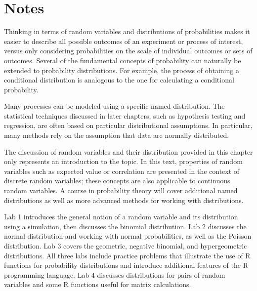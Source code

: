 

\section{Notes}
\label{sectionDistOfRVNotes}

Thinking in terms of random variables and distributions of probabilities makes it easier to describe all possible outcomes of an experiment or process of interest, versus only considering probabilities on the scale of individual outcomes or sets of outcomes. Several of the fundamental concepts of probability can naturally be extended to probability distributions. For example, the process of obtaining a conditional distribution is analogous to the one for calculating a conditional probability.

Many processes can be modeled using a specific named distribution. The statistical techniques discussed in later chapters, such as hypothesis testing and regression, are often based on particular distributional assumptions. In particular, many methods rely on the assumption that data are normally distributed. 

The discussion of random variables and their distribution provided in this chapter only represents an introduction to the topic. In this text, properties of random variables such as expected value or correlation are presented in the context of discrete random variables; these concepts are also applicable to continuous random variables. A course in probability theory will cover additional named distributions as well as more advanced methods for working with distributions.

Lab 1 introduces the general notion of a random variable and its distribution using a simulation, then discusses the binomial distribution.  Lab 2 discusses the normal distribution and working with normal probabilities, as well as the Poisson distribution. Lab 3 covers the geometric, negative binomial, and hypergeometric distributions.  All three labs include practice problems that illustrate the use of \textsf{R} functions for probability distributions and introduce additional features of the \textsf{R} programming language. Lab 4 discusses distributions for pairs of random variables and some \textsf{R} functions useful for matrix calculations.

